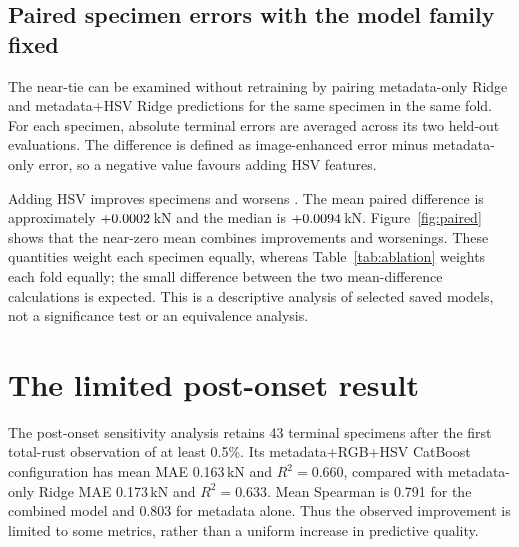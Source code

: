 \subsection{Paired specimen errors with the model family fixed}
The near-tie can be examined without retraining by pairing metadata-only Ridge and metadata+HSV Ridge predictions for the same specimen in the same fold. For each specimen, absolute terminal errors are averaged across its two held-out evaluations. The difference is defined as image-enhanced error minus metadata-only error, so a negative value favours adding HSV features.

Adding HSV improves \pairedImproved{} specimens and worsens \pairedWorsened{}. The mean paired difference is approximately $+0.0002$\,kN and the median is $+0.0094$\,kN. Figure~\ref{fig:paired} shows that the near-zero mean combines improvements and worsenings. These quantities weight each specimen equally, whereas Table~\ref{tab:ablation} weights each fold equally; the small difference between the two mean-difference calculations is expected. This is a descriptive analysis of selected saved models, not a significance test or an equivalence analysis.


\section{The limited post-onset result}
The post-onset sensitivity analysis retains 43 terminal specimens after the first total-rust observation of at least 0.5\%. Its metadata+RGB+HSV CatBoost configuration has mean MAE 0.163\,kN and $R^2=0.660$, compared with metadata-only Ridge MAE 0.173\,kN and $R^2=0.633$. Mean Spearman is 0.791 for the combined model and 0.803 for metadata alone. Thus the observed improvement is limited to some metrics, rather than a uniform increase in predictive quality.

